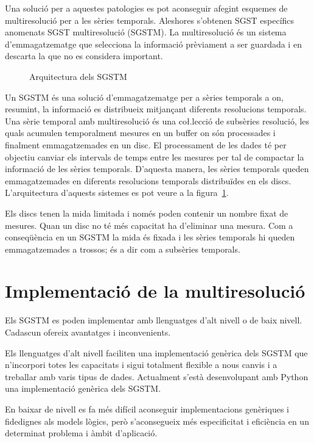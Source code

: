 Una solució per a aquestes patologies es pot aconseguir afegint
esquemes de multiresolució per a les sèries temporals. Aleshores
s'obtenen SGST específics anomenats SGST multiresolució (SGSTM).  La
multiresolució és un sistema d'emmagatzematge que selecciona la
informació prèviament a ser guardada i en descarta la que no es
considera important.


\begin{figure}[tp]
\centering

\caption{Arquitectura dels SGSTM}
\label{fig:model:bdstm}
\end{figure}


Un SGSTM és una solució d'emmagatzematge per a sèries temporals a on,
resumint, la informació es distribueix mitjançant diferents
resolucions temporals.  Una sèrie temporal amb multiresolució és una
co\l.lecció de subsèries resolució, les quals acumulen temporalment
mesures en un buffer on són processades i finalment emmagatzemades
en un disc. El processament de les dades té per objectiu canviar els
intervals de temps entre les mesures per tal de compactar la
informació de les sèries temporals. D'aquesta manera, les sèries
temporals queden emmagatzemades en diferents resolucions temporals
distribuïdes en els discs.  L'arquitectura d'aquests sistemes es pot
veure a la figura~\ref{fig:model:bdstm}.

Els discs tenen la mida limitada i només poden contenir un nombre
fixat de mesures. Quan un disc no té més capacitat ha d'eliminar una
mesura. Com a conseqüència en un SGSTM la mida és fixada i les sèries
temporals hi queden emmagatzemades a trossos; és a dir com a subsèries
temporals.



\section{Implementació de la multiresolució}

Els SGSTM es poden implementar amb llenguatges d'alt nivell o de baix
nivell. Cadascun ofereix avantatges i inconvenients.

Els llenguatges d'alt nivell faciliten una implementació genèrica dels
SGSTM que n'incorpori totes les capacitats i sigui totalment flexible
a nous canvis i a treballar amb varis tipus de dades. Actualment
s'està desenvolupant amb Python una implementació genèrica dels SGSTM.


En baixar de nivell es fa més difícil aconseguir implementacions
genèriques i fidedignes als models lògics, però s'aconsegueix més
especificitat i eficiència en un determinat problema i àmbit d'aplicació.

